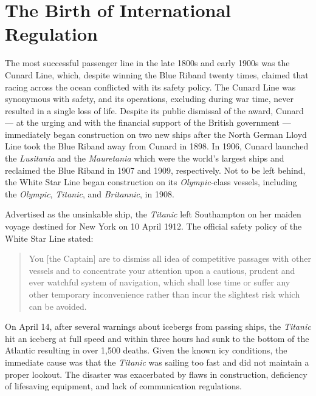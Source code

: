 \documentclass[twoside,symmetric,notoc]{tufte-book}
\begin{document}
\section{The Birth of International Regulation}
\par{%
The most successful passenger line in the late 1800s and early 1900s was the Cunard Line, which, despite winning the Blue Riband twenty times, claimed that racing across the ocean conflicted with its safety policy. The Cunard Line was synonymous with safety, and its operations, excluding during war time, never resulted in a single loss of life.\cite{Patten}\cite{Sutton} Despite its public dismissal of the award, Cunard --- at the urging and with the financial support of the British government --- immediately began construction on two new ships after the North German Lloyd Line took the Blue Riband away from Cunard in 1898.\cite{Young}\cite{Wiltbank} In 1906, Cunard launched the \textit{Lusitania} and the \textit{Mauretania} which were the world's largest ships and reclaimed the Blue Riband in 1907 and 1909, respectively.\cite{Paine} Not to be left behind, the White Star Line began construction on its \textit{Olympic}-class vessels, including the \textit{Olympic}, \textit{Titanic}, and \textit{Britannic}, in 1908.
}
\par{%
Advertised as the unsinkable ship, the \textit{Titanic} left Southampton on her maiden voyage destined for New York on 10 April 1912.\cite{Flayhart} The official safety policy of the White Star Line stated:
\begin{quotation}
You [the Captain] are to dismiss all idea of competitive passages with other vessels and to concentrate your attention upon a cautious, prudent and ever watchful system of navigation, which shall lose time or suffer any other temporary inconvenience rather than incur the slightest risk which can be avoided.\cite{GBC} 
\end{quotation}
On April 14, after several warnings about icebergs from passing ships, the \textit{Titanic} hit an iceberg at full speed and within three hours had sunk to the bottom of the Atlantic resulting in over 1,500 deaths.\cite{Cox} Given the known icy conditions, the immediate cause was that the \textit{Titanic} was sailing too fast and did not maintain a proper lookout. The disaster was exacerbated by flaws in construction, deficiency of lifesaving equipment, and lack of communication regulations.\cite{Senate}
}
\end{document}
